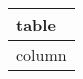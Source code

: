 \documentclass{article}
\begin{document}

\begin{tabular}{|l|} \hline
\textbf{table} \\ \hline
column \\ \hline
\end{tabular}
\end{document}
